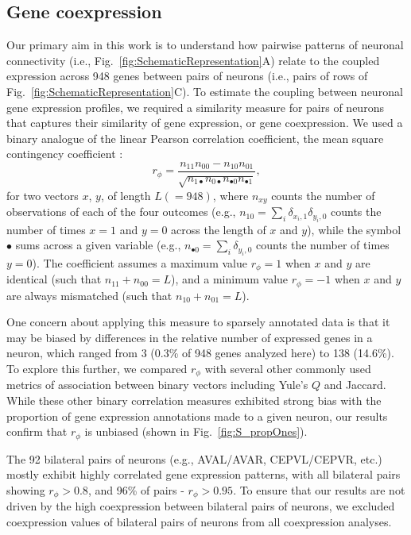 \documentclass[10pt,letterpaper]{article}
\begin{document}
\subsection*{Gene coexpression}
Our primary aim in this work is to understand how pairwise patterns of neuronal connectivity (i.e., Fig.~\ref{fig:SchematicRepresentation}A) relate to the coupled expression across 948 genes between pairs of neurons (i.e., pairs of rows of Fig.~\ref{fig:SchematicRepresentation}C).
To estimate the coupling between neuronal gene expression profiles, we required a similarity measure for pairs of neurons that captures their similarity of gene expression, or gene coexpression.
We used a binary analogue of the linear Pearson correlation coefficient, the mean square contingency coefficient \cite{Warrens2008}:
\begin{equation} \label{eq:rphi}
    r_\phi = \frac{n_{11}n_{00} - n_{10}n_{01}}{\sqrt{n_{1\bullet}n_{0\bullet}n_{\bullet 0}n_{\bullet 1}}},
\end{equation}
for two vectors $x$, $y$, of length $L (=948)$, where $n_{xy}$ counts the number of observations of each of the four outcomes (e.g., $n_{10} = \sum_i \delta_{x_i,1}\delta_{y_i,0}$ counts the number of times $x=1$ and $y=0$ across the length of $x$ and $y$), while the symbol $\bullet$ sums across a given variable (e.g., $n_{\bullet 0} = \sum_i \delta_{y_i,0}$ counts the number of times $y = 0$).
The coefficient assumes a maximum value $r_\phi = 1$ when $x$ and $y$ are identical (such that $n_{11} + n_{00} = L$), and a minimum value $r_\phi = -1$ when $x$ and $y$ are always mismatched (such that $n_{10} + n_{01} = L$).

One concern about applying this measure to sparsely annotated data is that it may be biased by differences in the relative number of expressed genes in a neuron, which ranged from 3 (0.3\% of 948 genes analyzed here) to 138 (14.6\%).
To explore this further, we compared $r_\phi$ with several other commonly used metrics of association between binary vectors including Yule's $Q$ and Jaccard.
While these other binary correlation measures exhibited strong bias with the proportion of gene expression annotations made to a given neuron, our results confirm that $r_\phi$ is unbiased (shown in Fig.~\ref{fig:S_propOnes}).

The 92 bilateral pairs of neurons (e.g., AVAL/AVAR, CEPVL/CEPVR, etc.) mostly exhibit highly correlated gene expression patterns, with all bilateral pairs showing $r_\phi > 0.8$, and 96\% of pairs - $r_\phi > 0.95$.
To ensure that our results are not driven by the high coexpression between bilateral pairs of neurons, we excluded coexpression values of bilateral pairs of neurons from all coexpression analyses.
\end{document}
